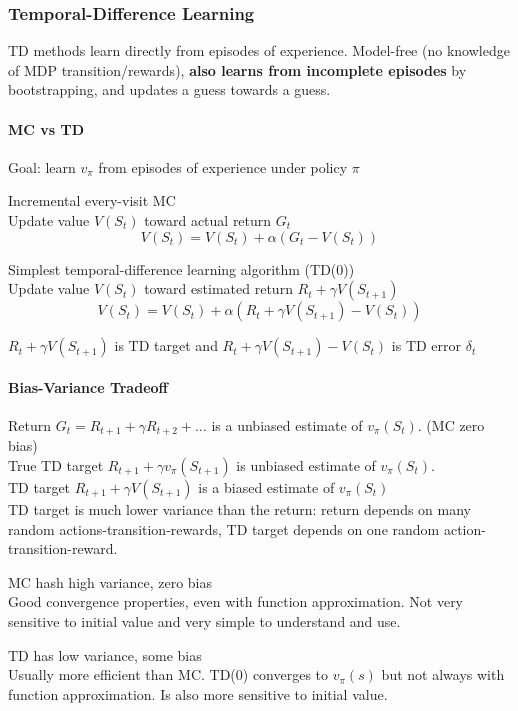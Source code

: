 \documentclass[10pt]{report}
\begin{document}
\subsubsection{Temporal-Difference Learning}
TD methods learn directly from episodes of experience. Model-free (no knowledge of MDP transition/rewards), \textbf{also learns from incomplete episodes} by bootstrapping, and updates a guess towards a guess.
\paragraph{MC vs TD} Goal: learn $v_\pi$ from episodes of experience under policy $\pi$
\begin{list}{}{}
	\item Incremental every-visit MC\\
	Update value $V(S_t)$ toward actual return $G_t$
	$$V(S_t) = V(S_t) +\alpha(G_t-V(S_t))$$
	\item Simplest temporal-difference learning algorithm (TD(0))\\
	Update value $V(S_t)$ toward estimated return $R_t + \gamma V(S_{t+1})$
	$$V(S_t) = V(S_t) + \alpha(R_t+\gamma V(S_{t+1}) - V(S_t))$$
\end{list}
$R_t+\gamma V(S_{t+1})$ is TD target and  $R_t+\gamma V(S_{t+1}) - V(S_t)$ is TD error $\delta_t$
\paragraph{Bias-Variance Tradeoff} Return $G_t = R_{t+1} + \gamma R_{t+2}+\ldots$ is a unbiased estimate of $v_\pi(S_t)$. (MC zero bias)\\
True TD target $R_{t+1} + \gamma v_\pi(S_{t+1})$ is unbiased estimate of $v_\pi(S_t)$.\\
TD target $R_{t+1} + \gamma V(S_{t+1})$ is a biased estimate of $v_\pi(S_t)$\\
TD target is much lower variance than the return: return depends on many random actions-transition-rewards, TD target depends on one random action-transition-reward.
\begin{list}{}{}
	\item MC hash high variance, zero bias\\
	Good convergence properties, even with function approximation. Not very sensitive to initial value and very simple to understand and use.
	\item TD has low variance, some bias\\
	Usually more efficient than MC. TD(0) converges to $v_\pi(s)$ but not always with function approximation. Is also more sensitive to initial value.
\end{list}
\end{document}
